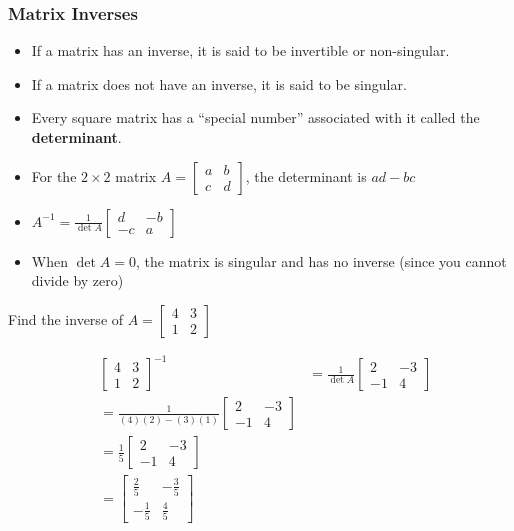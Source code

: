 \documentclass[
  letterpaper,
  DIV=11,
  numbers=noendperiod]{scrartcl}
\begin{document}
\hypertarget{matrix-inverses}{%
\subsubsection{Matrix Inverses}\label{matrix-inverses}}

\begin{itemize}
\item
  If a matrix has an inverse, it is said to be invertible or
  non-singular.
\item
  If a matrix does not have an inverse, it is said to be singular.
\item
  Every square matrix has a ``special number'' associated with it called
  the \textbf{determinant}.
\item
  For the \(2 \times 2\) matrix
  \(A = \begin{bmatrix}a & b \\ c & d \end{bmatrix}\), the determinant
  is \(ad-bc\)
\item
  \(A^{-1} = \frac{1}{\det{A}}\begin{bmatrix}d & -b \\ -c & a \end{bmatrix}\)
\item
  When \(\det{A} = 0\), the matrix is singular and has no inverse (since
  you cannot divide by zero)
\end{itemize}

Find the inverse of \(A = \begin{bmatrix}4 & 3 \\ 1 & 2 \end{bmatrix}\)

\begin{align*}
&\begin{bmatrix}4 & 3 \\ 1 & 2 \end{bmatrix}^{-1} &= \frac{1}{\det{A}}\begin{bmatrix}2 & -3 \\ -1 & 4 \end{bmatrix} \\
&= \frac{1}{(4)(2)-(3)(1)}\begin{bmatrix}2 & -3 \\ -1 & 4 \end{bmatrix} \\
&= \frac{1}{5}\begin{bmatrix}2 & -3 \\ -1 & 4 \end{bmatrix} \\
&= \begin{bmatrix}\frac{2}{5} & -\frac{3}{5} \\ -\frac{1}{5} & \frac{4}{5} \end{bmatrix}
\end{align*}
\end{document}
